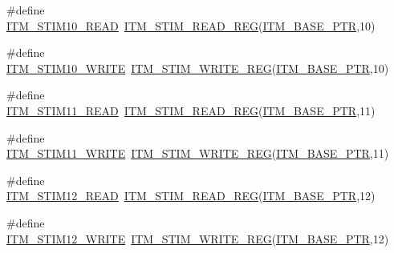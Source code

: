 \begin{DoxyCompactItemize}
\item 
\#define \hyperlink{group___i_t_m___register___accessor___macros_gac52c9a2197fa51dd2395e68ce8f77f21}{I\+T\+M\+\_\+\+S\+T\+I\+M10\+\_\+\+R\+E\+AD}~\hyperlink{group___i_t_m___register___accessor___macros_ga5009882336aadcd4f37b45cf3395c450}{I\+T\+M\+\_\+\+S\+T\+I\+M\+\_\+\+R\+E\+A\+D\+\_\+\+R\+EG}(\hyperlink{group___i_t_m___peripheral_gafaddee8fe8b6a898d4e5edc43ee0d703}{I\+T\+M\+\_\+\+B\+A\+S\+E\+\_\+\+P\+TR},10)
\item 
\#define \hyperlink{group___i_t_m___register___accessor___macros_ga777b8d32021dcda309623609448e4042}{I\+T\+M\+\_\+\+S\+T\+I\+M10\+\_\+\+W\+R\+I\+TE}~\hyperlink{group___i_t_m___register___accessor___macros_ga049ca92a4e78e77c19af81e51aa73f1c}{I\+T\+M\+\_\+\+S\+T\+I\+M\+\_\+\+W\+R\+I\+T\+E\+\_\+\+R\+EG}(\hyperlink{group___i_t_m___peripheral_gafaddee8fe8b6a898d4e5edc43ee0d703}{I\+T\+M\+\_\+\+B\+A\+S\+E\+\_\+\+P\+TR},10)
\item 
\#define \hyperlink{group___i_t_m___register___accessor___macros_ga0303347d6234c6044d64450073e3111d}{I\+T\+M\+\_\+\+S\+T\+I\+M11\+\_\+\+R\+E\+AD}~\hyperlink{group___i_t_m___register___accessor___macros_ga5009882336aadcd4f37b45cf3395c450}{I\+T\+M\+\_\+\+S\+T\+I\+M\+\_\+\+R\+E\+A\+D\+\_\+\+R\+EG}(\hyperlink{group___i_t_m___peripheral_gafaddee8fe8b6a898d4e5edc43ee0d703}{I\+T\+M\+\_\+\+B\+A\+S\+E\+\_\+\+P\+TR},11)
\item 
\#define \hyperlink{group___i_t_m___register___accessor___macros_ga2b6f1a25e7ac17786baf3b401c94a1d9}{I\+T\+M\+\_\+\+S\+T\+I\+M11\+\_\+\+W\+R\+I\+TE}~\hyperlink{group___i_t_m___register___accessor___macros_ga049ca92a4e78e77c19af81e51aa73f1c}{I\+T\+M\+\_\+\+S\+T\+I\+M\+\_\+\+W\+R\+I\+T\+E\+\_\+\+R\+EG}(\hyperlink{group___i_t_m___peripheral_gafaddee8fe8b6a898d4e5edc43ee0d703}{I\+T\+M\+\_\+\+B\+A\+S\+E\+\_\+\+P\+TR},11)
\item 
\#define \hyperlink{group___i_t_m___register___accessor___macros_gabb2b8e4fa01909ba0dda5d7d62bb2b0c}{I\+T\+M\+\_\+\+S\+T\+I\+M12\+\_\+\+R\+E\+AD}~\hyperlink{group___i_t_m___register___accessor___macros_ga5009882336aadcd4f37b45cf3395c450}{I\+T\+M\+\_\+\+S\+T\+I\+M\+\_\+\+R\+E\+A\+D\+\_\+\+R\+EG}(\hyperlink{group___i_t_m___peripheral_gafaddee8fe8b6a898d4e5edc43ee0d703}{I\+T\+M\+\_\+\+B\+A\+S\+E\+\_\+\+P\+TR},12)
\item 
\#define \hyperlink{group___i_t_m___register___accessor___macros_ga61fb646c29b6f56928ca4e570b1e4167}{I\+T\+M\+\_\+\+S\+T\+I\+M12\+\_\+\+W\+R\+I\+TE}~\hyperlink{group___i_t_m___register___accessor___macros_ga049ca92a4e78e77c19af81e51aa73f1c}{I\+T\+M\+\_\+\+S\+T\+I\+M\+\_\+\+W\+R\+I\+T\+E\+\_\+\+R\+EG}(\hyperlink{group___i_t_m___peripheral_gafaddee8fe8b6a898d4e5edc43ee0d703}{I\+T\+M\+\_\+\+B\+A\+S\+E\+\_\+\+P\+TR},12)

\end{DoxyCompactItemize}

